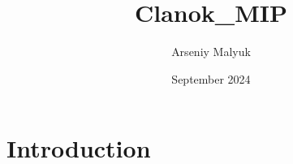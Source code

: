 \documentclass{article}
\title{Clanok_MIP}
\author{Arseniy Malyuk}
\date{September 2024}
\begin{document}
\maketitle

\section{Introduction}
\end{document}
